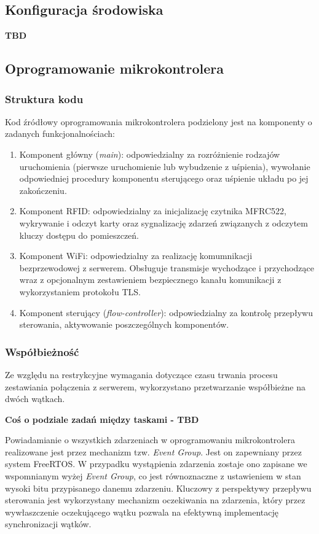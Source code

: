         \subsection{Konfiguracja środowiska}
            \textbf{TBD}

        \subsection{Oprogramowanie mikrokontrolera}

            \subsubsection{Struktura kodu}
                Kod źródłowy oprogramowania mikrokontrolera podzielony jest na komponenty o zadanych funkcjonalnościach:
                \begin{enumerate}
                    \item Komponent główny (\textit{main}): odpowiedzialny za rozróżnienie rodzajów uruchomienia (pierwsze uruchomienie lub wybudzenie z uśpienia), wywołanie odpowiedniej procedury komponentu sterującego oraz uśpienie układu po jej zakończeniu.
                    \item Komponent RFID: odpowiedzialny za inicjalizację czytnika MFRC522, wykrywanie i odczyt karty oraz sygnalizację zdarzeń związanych z odczytem kluczy dostępu do pomieszczeń.
                    \item Komponent WiFi: odpowiedzialny za realizację komumnikacji bezprzewodowej z serwerem. Obsługuje transmisje wychodzące i przychodzące wraz z opcjonalnym zestawieniem bezpiecznego kanału komunikacji z wykorzystaniem protokołu TLS.
                    \item Komponent sterujący (\textit{flow-controller}): odpowiedzialny za kontrolę przepływu sterowania, aktywowanie poszczególnych komponentów.
                \end{enumerate}

            \subsubsection{Współbieżność}
                Ze względu na restrykcyjne wymagania dotyczące czasu trwania procesu zestawiania połączenia z serwerem, wykorzystano przetwarzanie współbieżne na dwóch wątkach.

                \textbf{Coś o podziale zadań między taskami - TBD}

                Powiadamianie o wszystkich zdarzeniach w oprogramowaniu mikrokontrolera realizowane jest przez mechanizm tzw. \textit{Event Group}. Jest on zapewniany przez system FreeRTOS. W przypadku wystąpienia zdarzenia zostaje ono zapisane we wspomnianym wyżej \textit{Event Group}, co jest równoznaczne z ustawieniem w stan wysoki bitu przypisanego danemu zdarzeniu. Kluczowy z perspektywy przepływu sterowania jest wykorzystany mechanizm oczekiwania na zdarzenia, który przez wywłaszczenie oczekującego wątku pozwala na efektywną implementację synchronizacji wątków.

